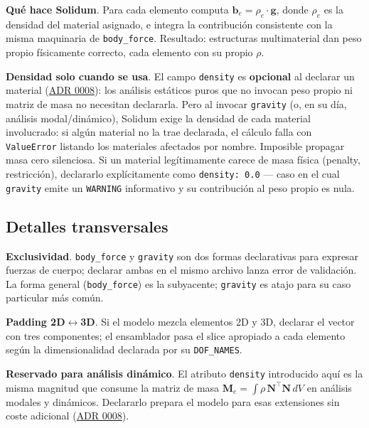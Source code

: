 \documentclass[11pt,oneside]{report}
\begin{document}
\textbf{Qué hace Solidum}. Para cada elemento computa $\mathbf b_e = \rho_e\cdot\mathbf g$, donde $\rho_e$ es la densidad del material asignado, e integra la contribución consistente con la misma maquinaria de \texttt{body\_force}. Resultado: estructuras multimaterial dan peso propio físicamente correcto, cada elemento con su propio $\rho$.

\textbf{Densidad solo cuando se usa}. El campo \texttt{density} es \textbf{opcional} al declarar un material (\href{https://github.com/jretamav/solidum-fem/blob/main/docs/adr/0008-densidad-propiedad-del-material.md}{ADR 0008}): los análisis estáticos puros que no invocan peso propio ni matriz de masa no necesitan declararla. Pero al invocar \texttt{gravity} (o, en su día, análisis modal/dinámico), Solidum exige la densidad de cada material involucrado: si algún material no la trae declarada, el cálculo falla con \texttt{ValueError} listando los materiales afectados por nombre. Imposible propagar masa cero silenciosa. Si un material legítimamente carece de masa física (penalty, restricción), declararlo explícitamente como \texttt{density: 0.0} --- caso en el cual \texttt{gravity} emite un \texttt{WARNING} informativo y su contribución al peso propio es nula.

\subsection{Detalles transversales}

\textbf{Exclusividad}. \texttt{body\_force} y \texttt{gravity} son dos formas declarativas para expresar fuerzas de cuerpo; declarar ambas en el mismo archivo lanza error de validación. La forma general (\texttt{body\_force}) es la subyacente; \texttt{gravity} es atajo para su caso particular más común.

\textbf{Padding 2D\ensuremath{\leftrightarrow}3D}. Si el modelo mezcla elementos 2D y 3D, declarar el vector con tres componentes; el ensamblador pasa el slice apropiado a cada elemento según la dimensionalidad declarada por su \texttt{DOF\_NAMES}.

\textbf{Reservado para análisis dinámico}. El atributo \texttt{density} introducido aquí es la misma magnitud que consume la matriz de masa $\mathbf M_e = \int \rho\,\mathbf N^\top\mathbf N\,dV$ en análisis modales y dinámicos. Declararlo prepara el modelo para esas extensiones sin coste adicional (\href{https://github.com/jretamav/solidum-fem/blob/main/docs/adr/0008-densidad-propiedad-del-material.md}{ADR 0008}).
\end{document}
